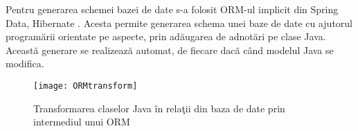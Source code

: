 Pentru generarea schemei bazei de date s-a folosit ORM-ul implicit din Spring Data, Hibernate \autocite{hibernate} . Acesta permite generarea schema unei baze de date cu ajutorul programării orientate pe aspecte, prin adăugarea de adnotări pe clase Java. Această generare se realizează automat, de fiecare dacă când modelul Java se modifica.
\begin{figure}[H]
	\centering
	\texttt{[image: ORMtransform]}
	\captionsetup{justification=centering}
	\caption{Transformarea claselor Java în relaţii din baza de date prin intermediul unui ORM}
	\label{fig:ORMtransform}
\end{figure}